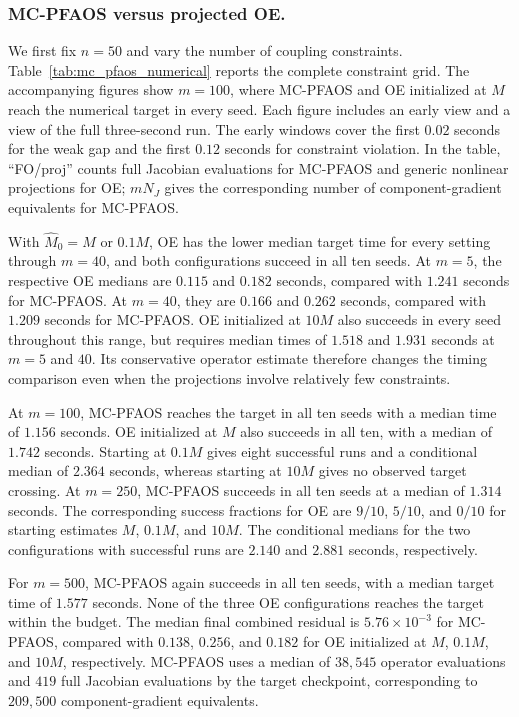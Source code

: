 \subsubsection{MC-PFAOS versus projected OE.}
We first fix $n=50$ and vary the number of coupling constraints.
Table~\ref{tab:mc_pfaos_numerical} reports the complete constraint grid.
The accompanying figures show $m=100$, where MC-PFAOS and OE initialized
at $M$ reach the numerical target in every seed. Each figure includes an early view and
a view of the full three-second run. The early windows cover the first
$0.02$ seconds for the weak gap and the first $0.12$ seconds for
constraint violation. In the table, ``FO/proj'' counts full Jacobian
evaluations for MC-PFAOS and generic nonlinear projections for OE;
$mN_J$ gives the corresponding number of component-gradient equivalents
for MC-PFAOS.




With $\widehat M_0=M$ or $0.1M$, OE has the lower median target time
for every setting through $m=40$, and both configurations succeed in all
ten seeds. At $m=5$, the respective OE medians are $0.115$ and $0.182$
seconds, compared with $1.241$ seconds for MC-PFAOS. At $m=40$, they are
$0.166$ and $0.262$ seconds, compared with $1.209$ seconds for MC-PFAOS.
OE initialized at $10M$ also succeeds in every seed throughout this range,
but requires median times of $1.518$ and $1.931$ seconds at $m=5$ and
$40$. Its conservative operator estimate therefore changes the timing
comparison even when the projections involve relatively few constraints.

At $m=100$, MC-PFAOS reaches the target in all ten seeds with a median
time of $1.156$ seconds. OE initialized at $M$ also succeeds in all ten,
with a median of $1.742$ seconds. Starting at $0.1M$ gives eight successful
runs and a conditional median of $2.364$ seconds, whereas starting at
$10M$ gives no observed target crossing. At $m=250$, MC-PFAOS succeeds
in all ten seeds at a median of $1.314$ seconds. The corresponding success
fractions for OE are $9/10$, $5/10$, and $0/10$ for starting estimates
$M$, $0.1M$, and $10M$. The conditional medians for the two configurations
with successful runs are $2.140$ and $2.881$ seconds, respectively.

For $m=500$, MC-PFAOS again succeeds in all ten seeds, with a median
target time of $1.577$ seconds. None of the three OE configurations reaches
the target within the budget. The median final combined residual is
$5.76\times10^{-3}$ for MC-PFAOS, compared with $0.138$, $0.256$, and
$0.182$ for OE initialized at $M$, $0.1M$, and $10M$, respectively.
MC-PFAOS uses a median of $38{,}545$ operator evaluations and $419$
full Jacobian evaluations by the target checkpoint, corresponding to
$209{,}500$ component-gradient equivalents.

